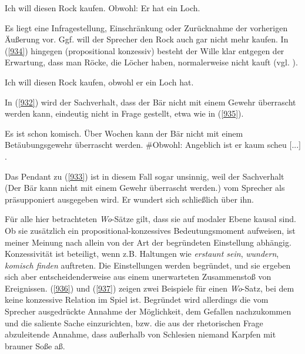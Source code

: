 {\begin{exe}
	\ex\label{933}
	Ich will diesen Rock kaufen. Obwohl: Er hat ein Loch.	     
	\newline    
	\hbox{}\hfill\hbox{\citet[436]{Antomo2013}}
\end{exe}
Es liegt eine Infragestellung, Einschränkung oder Zurücknahme der vorherigen Äußerung vor. Ggf. will der Sprecher den Rock auch gar nicht mehr kaufen. In (\ref{934}) hingegen (propositional konzessiv)  besteht der Wille klar entgegen der Erwartung, dass man Röcke, die Löcher haben, normalerweise nicht kauft (vgl. \citealt[436]{Antomo2013}).

\begin{exe}
	\ex\label{934}
	Ich will diesen Rock kaufen, obwohl er ein Loch hat.	   
	\newline      
	\hbox{}\hfill\hbox{\citet[436]{Antomo2013}}
\end{exe}
In (\ref{932}) wird der Sachverhalt, dass der Bär nicht mit einem Gewehr überrascht werden kann, eindeutig nicht in Frage gestellt, etwa wie in (\ref{935}).

\begin{exe}
	\ex\label{935}
	\scriptsize
	Es ist schon komisch. Über Wochen kann der Bär nicht mit einem Betäubungsgewehr überrascht werden. \#Obwohl: Angeblich ist er kaum scheu $[$...$]$.	         
\end{exe}
Das Pendant zu (\ref{933}) ist in diesem Fall sogar unsinnig, weil der Sachverhalt (Der Bär kann nicht mit einem Gewehr überrascht werden.) vom Sprecher als präsupponiert  ausgegeben wird. Er wundert sich schließlich über ihn.

Für alle hier betrachteten \textit{Wo}-Sätze gilt, dass sie auf modaler Ebene kausal sind. Ob sie zusätzlich ein propositional-konzessives Bedeutungsmoment aufweisen, ist meiner Meinung nach allein von der Art der begründeten Einstellung abhängig. Konzessivität ist beteiligt, wenn z.B. Haltungen wie \textit{erstaunt sein}, \textit{wundern}, \textit{komisch finden} auftreten. Die Einstellungen werden begründet, und sie ergeben sich aber entscheidenderweise aus einem unerwarteten Zusammenstoß von Ereignissen. (\ref{936}) und (\ref{937}) zeigen zwei Beispiele für einen \textit{Wo}-Satz, bei dem keine konzessive Relation im Spiel ist. Begründet wird allerdings die vom Sprecher ausgedrückte Annahme der Möglichkeit, dem Gefallen nachzukommen und die saliente Sache einzurichten, bzw. die aus der rhetorischen Frage abzuleitende Annahme, dass außerhalb von Schlesien niemand Karpfen mit brauner Soße aß.	

}

